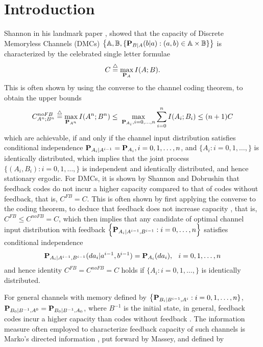 \documentclass[11pt, a4paper, journal,onecolumn]{IEEEtran}
\newcommand{\sr}{\stackrel}
\newcommand{\tri}{\sr{\triangle}{=}}
\newcommand{\bea}{\begin{eqnarray}}
\newcommand{\eea}{\end{eqnarray}}
\newcommand{\hso}{\hspace{.1in}}
\begin{document}
\section{Introduction}
\par   Shannon in his landmark paper \cite{shannon48}, showed that the  capacity of Discrete Memoryless Channels (DMCs) $\big\{{\mathbb A}, {\mathbb B},\{{\bf P}_{B|A}(b|a): (a,b)\in {\mathbb A}\times {\mathbb B}\} \big\}$ is characterized by the celebrated single letter formulae
\bea
C\tri \max_{{\bf P}_A} I(A;B). \label{cap_fb_c}
\eea
This is often shown by using the converse to the channel coding theorem, to obtain the  upper bounds \cite{cover-thomas2006} 
\bea
C_{A^n ; B^n}^{noFB}\tri \max_{{\bf P}_{A^n}} I(A^n;B^n) \leq \; \max_{{\bf P}_{A_i}, i=0, \ldots, n} \sum_{i=0}^n I(A_i;B_i)\leq (n+1) C \label{cap_nf_c1}
\eea
which are achievable, if and only if  the channel input distribution  satisfies conditional independence $
{\bf P}_{A_i|A^{i-1}}={\bf P}_{A_i},         i=0, 1, \ldots, n$, and   $\{A_i:i =0, 1, \ldots, \}$ is identically distributed, which  implies that the  joint process $\{(A_i, B_i): i=0,1, \ldots, \}$ is independent and identically distributed, and hence stationary ergodic.
 For DMCs, it is shown by Shannon \cite{shannon1956}  and Dobrushin \cite{dubrushin1958} that feedback codes do not incur a higher capacity compared to that of codes without feedback, that is, $C^{FB}=C$. This  is often shown by first applying  the converse to the coding theorem,  to deduce that feedback does not increase capacity \cite{cover-pombra1989}, that is, $C^{FB} \leq C^{noFB}=C$, which then implies that any candidate of optimal channel input distribution with feedback $\Big\{{\bf P}_{A_i|A^{i-1}, B^{i-1}}: i=0, \ldots, n\Big\}$ satisfies conditional independence
\begin{align}
 {\bf P}_{A_i|A^{i-1}, B^{i-1}}(da_i|a^{i-1}, b^{i-1})={\bf P}_{A_i}(da_i),        \hso  i=0, 1, \ldots, n \label{CI_DMC}
\end{align} 
   and hence identity $C^{FB}=C^{noFB}=C$ holds if  $\{A_i:i =0, 1, \ldots, \}$ is identically distributed. 
\par For general channels with memory defined by $\big\{{\bf P}_{B_i|B^{i-1}, A^i}: i=0, 1, \ldots, n\}$, ${\bf P}_{B_0|B^{-1}, A^0}={\bf P}_{B_0|B^{-1}, A_0}$, where  $B^{-1}$ is the initial state,  in general, feedback codes incur a higher capacity  than  codes  without feedback \cite{cover-thomas2006,ihara1993}. The information measure often employed to characterize feedback capacity of such channels is Marko's directed information \cite{marko1973}, put forward by Massey\cite{massey1990}, and  defined by 
\end{document}
